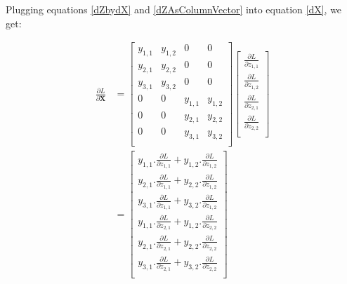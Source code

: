 \documentclass{article}
\newcommand{\matr}[1]{\mathbf{#1}} %
\begin{document}
Plugging equations \ref{dZbydX} and \ref{dZAsColumnVector} into equation \ref{dX}, we get:

\begin{align}
\frac{\partial L}{\partial \matr{X}} &=
\begin{bmatrix}
y_{1,1} & y_{1,2} & 0 & 0 \\[0.5em]
y_{2,1} & y_{2,2} & 0 & 0 \\[0.5em]
y_{3,1} & y_{3,2} & 0 & 0 \\[0.5em]
0 & 0 & y_{1,1} & y_{1,2} \\[0.5em]
0 & 0 & y_{2,1} & y_{2,2} \\[0.5em]
0 & 0 & y_{3,1} & y_{3,2} \\[0.5em]
\end{bmatrix}
\begin{bmatrix}
\frac{\partial L}{\partial z_{1,1}} \\[0.7em]
\frac{\partial L}{\partial z_{1,2}} \\[0.7em]
\frac{\partial L}{\partial z_{2,1}} \\[0.7em]
\frac{\partial L}{\partial z_{2,2}} \\[0.7em]
\end{bmatrix}
\nonumber \\ 
&= 
\begin{bmatrix}
y_{1,1}.\frac{\partial L}{\partial z_{1,1}} + y_{1,2}.\frac{\partial L}{\partial z_{1,2}} \\[0.7em]
y_{2,1}.\frac{\partial L}{\partial z_{1,1}} + y_{2,2}.\frac{\partial L}{\partial z_{1,2}} \\[0.7em]
y_{3,1}.\frac{\partial L}{\partial z_{1,1}} + y_{3,2}.\frac{\partial L}{\partial z_{1,2}} \\[0.7em]
y_{1,1}.\frac{\partial L}{\partial z_{2,1}} + y_{1,2}.\frac{\partial L}{\partial z_{2,2}} \\[0.7em]
y_{2,1}.\frac{\partial L}{\partial z_{2,1}} + y_{2,2}.\frac{\partial L}{\partial z_{2,2}} \\[0.7em]
y_{3,1}.\frac{\partial L}{\partial z_{2,1}} + y_{3,2}.\frac{\partial L}{\partial z_{2,2}} \\[0.7em]
\end{bmatrix} \label{dXAsColumnVector}
\end{align}
\end{document}
